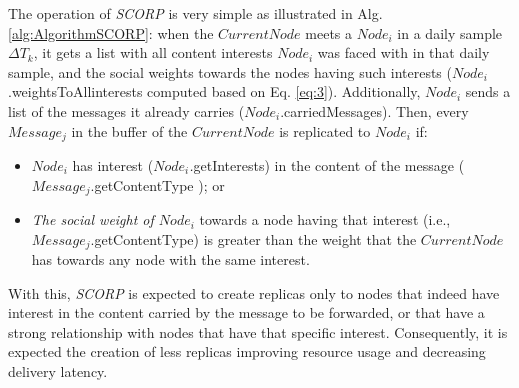 \documentclass[lnicst]{svmultln}
\begin{document}
The operation of \emph{SCORP }is very simple as illustrated in Alg.
\ref{alg:AlgorithmSCORP}: when the $CurrentNode$ meets a \emph{$Node_{i}$}
in a daily sample $\Delta T_{k}$, it gets a list with all content
interests \emph{$Node_{i}$} was faced with in that daily sample,
and the social weights towards the nodes having such interests (\emph{$Node_{i}$}.weightsToAllinterests
computed based on Eq. \ref{eq:3}). Additionally, \emph{$Node_{i}$}
sends a list of the messages it already carries (\emph{$Node_{i}$}.carriedMessages).
Then, every $Message_{j}$ in the buffer of the $CurrentNode$ is
replicated to \emph{$Node_{i}$ }if:
\begin{itemize}
\item \emph{$Node_{i}$} has interest (\emph{$Node_{i}$.}getInterests)
in the content of the message\linebreak{}
($Message_{j}$.getContentType ); or\\

\item \emph{The social weight of $Node_{i}$} towards a node having that
interest\linebreak{}
(i.e., $Message_{j}$.getContentType) is greater than the weight that
the\linebreak{}
$CurrentNode$ has towards any node with the same interest.
\end{itemize}
With this, \emph{SCORP} is expected to create replicas only to nodes
that indeed have interest in the content carried by the message to
be forwarded, or that have a strong relationship with nodes that have
that specific interest. Consequently, it is expected the creation
of less replicas improving resource usage and decreasing delivery
latency.
\end{document}
